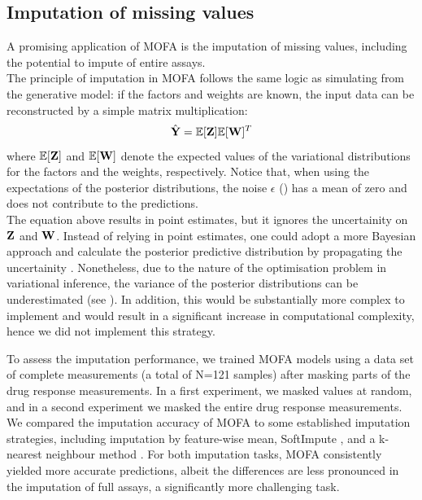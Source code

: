 \subsection{Imputation of missing values}

A promising application of MOFA is the imputation of missing values, including the potential to impute of entire assays.\\
The principle of imputation in MOFA follows the same logic as simulating from the generative model: if the factors and weights are known, the input data can be reconstructed by a simple matrix multiplication:
\[
	\hat{{\bf Y}} = \mathbb{E}[{\bf Z}] \mathbb{E}[{\bf W}]^T
\]
where $\mathbb{E}[{\bf Z}]$ and $\mathbb{E}[{\bf W}]$ denote the expected values of the variational distributions for the factors and the weights, respectively. Notice that, when using the expectations of the posterior distributions, the noise $\epsilon$ () has a mean of zero and does not contribute to the predictions.\\
The equation above results in point estimates, but it ignores the uncertainity on ${\bf Z}$ and ${\bf W}$. Instead of relying in point estimates, one could adopt a more Bayesian approach and calculate the posterior predictive distribution by propagating the uncertainity \cite{Gelman2013}. Nonetheless, due to the nature of the optimisation problem in variational inference, the variance of the posterior distributions can be underestimated (see ). In addition, this would be substantially more complex to implement and would result in a significant increase in computational complexity, hence we did not implement this strategy.

To assess the imputation performance, we trained MOFA models using a data set of complete measurements (a total of N=121 samples) after masking parts of the drug response measurements. In a first experiment, we masked values at random, and in a second experiment we masked the entire drug response measurements. We compared the imputation accuracy of MOFA to some established imputation strategies, including imputation by feature-wise mean, SoftImpute \cite{Mazumder2010}, and a k-nearest neighbour method \cite{Troyanskaya2001}. For both imputation tasks, MOFA consistently yielded more accurate predictions, albeit the differences are less pronounced in the imputation of full assays, a significantly more challenging task.\\

